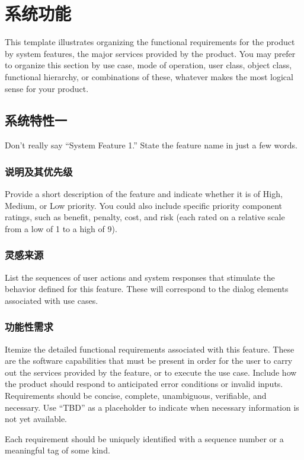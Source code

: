 \documentclass{ctexart}
\begin{document}
\section{系统功能}\label{S:system-features}
This template illustrates organizing the functional requirements for the 
product by system features, the major services provided by the product. You may 
prefer to organize this section by use case, mode of operation, user class, 
object class, functional hierarchy, or combinations of these, whatever makes the 
most logical sense for your product.
\subsection{系统特性一}
Don't really say ``System Feature 1.'' State the feature name in just a few 
words.
\subsubsection{说明及其优先级}
Provide a short description of the feature and indicate whether it is of 
High, Medium, or Low priority. You could also include specific priority 
component ratings, such as benefit, penalty, cost, and risk (each rated on a 
relative scale from a low of 1 to a high of 9).

\subsubsection{灵感来源}
List the sequences of user actions and system responses that stimulate the 
behavior defined for this feature. These will correspond to the dialog elements 
associated with use cases.

\subsubsection{功能性需求}
Itemize the detailed functional requirements associated with this feature.  
These are the software capabilities that must be present in order for the user 
to carry out the services provided by the feature, or to execute the use case.  
Include how the product should respond to anticipated error conditions or 
invalid inputs. Requirements should be concise, complete, unambiguous, 
verifiable, and necessary. Use ``TBD'' as a placeholder to indicate when necessary 
information is not yet available.

Each requirement should be uniquely identified with a sequence number or a 
meaningful tag of some kind.
\end{document}
